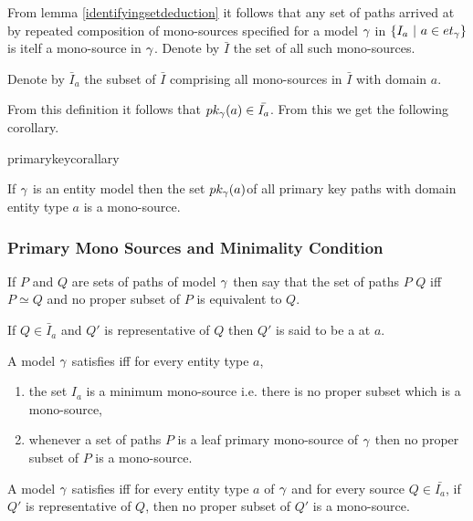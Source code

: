 From lemma \ref{identifyingsetdeduction} it follows that any set of paths arrived at by repeated composition of mono-sources specified for a model $\gamma$ in $\left\{I_a \ \middle|\ a \in et_{\gamma}\right\}$ is itelf a mono-source in $\gamma$. Denote by $\bar{I}$ the set  of all such mono-sources.

Denote by $\bar{I}_a$ the subset of $\bar{I}$ comprising all mono-sources in $\bar{I}$ with domain $a$.

 From this definition it follows that $pk_{\gamma}(a) \in \bar{I_a}$. From this we get the following corollary.

primarykeycorallary
\begin{corollary}
\label{primarykeycorallary}
If $\gamma$ is an entity model then the set $pk_{\gamma}(a)$of all primary key paths 
with domain entity type $a$ is a mono-source.
\end{corollary}

\subsubsection{Primary Mono Sources and Minimality Condition}
\label{minimalitycondition}


\begin{definition}
If $P$ and $Q$ are sets of paths of model $\gamma$ then say that the set of paths $P$ 
 $Q$ 
iff $P \simeq Q$ and no proper subset of $P$ is equivalent to $Q$.
\end{definition}

\begin{definition}
If $Q \in \bar{I}_a$ and $Q'$ is representative of $Q$ then $Q'$ is said to be
a  at $a$. 
\end{definition}

\begin{definition}
A model $\gamma$ satisfies  iff for every entity type $a$,
\begin{enumerate}
\item the set $I_a$ is a minimum mono-source i.e. there is no proper subset which is a mono-source,
\item whenever a set of paths $P$ is a leaf primary mono-source of $\gamma$ then no proper subset of $P$ is a mono-source.
\end{enumerate}
\end{definition}

\begin{conjecture}
A model $\gamma$ satisfies  iff 
for every entity type $a$ of $\gamma$ and for every source $Q \in \bar{I_a}$, if $Q'$ is representative
of  $Q$, then no proper subset of $Q'$ is a mono-source. 

\end{conjecture}


